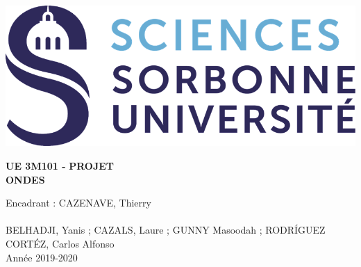 \documentclass[10pt,a4paper]{article}
\author{BELHADJI, Yanis ; CAZALS, Laure ; GUNNY Masoodah ; RODRÍGUEZ CORTÉZ, Carlos Alfonso}
\title{}
\begin{document}
\begin{titlepage}
\includegraphics[scale=0.4]{logo.png}
\begin{center}
\vspace*{7cm}
{\Huge  \textbf{UE 3M101 - }}{\huge \textbf{PROJET}}
\\

 \vspace{1.5cm}
 \huge \textbf{ONDES}
 \vfill

{\large  Encadrant : CAZENAVE, Thierry}
\\~\\
{\normalsize BELHADJI, Yanis ; CAZALS, Laure ; GUNNY Masoodah ; RODRÍGUEZ CORTÉZ, Carlos Alfonso}
\\
\vspace{1cm}
{\normalsize Année 2019-2020}
 \end{center}

\end{titlepage}
 
 
\thispagestyle{empty}
\vspace*{\fill}
\renewcommand{\contentsname}{\Huge Sommaire}
\tableofcontents
\vspace{\fill}


\pagebreak
\setcounter{page}{1}
\end{document}
